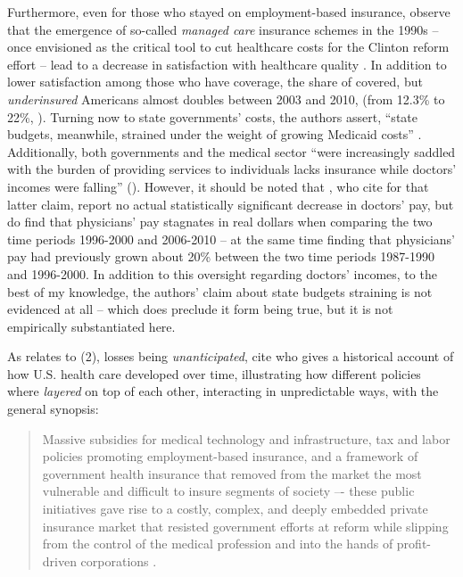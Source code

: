 \documentclass[11pt]{article}
\begin{document}
Furthermore, even for those who stayed on employment-based insurance, \textcite[][]{Jacobs2014} observe that the emergence of so-called \textit{managed care} insurance schemes in the 1990s -- once envisioned as the critical tool to cut healthcare costs for the Clinton reform effort -- lead to a decrease in satisfaction with healthcare quality \parencite[see][]{Thorpe1999}. In addition to lower satisfaction among those who have coverage, the share of covered, but \textit{underinsured} Americans almost doubles between 2003 and 2010, (from 12.3\% to 22\%, ). Turning now to state governments' costs, the authors assert, \enquote{state budgets, meanwhile, strained under the weight of growing Medicaid costs} \parencite[][p. 451]{Jacobs2014}. Additionally, both governments and the medical sector \enquote{were increasingly saddled with the burden of providing services to individuals lacks insurance while doctors' incomes were falling} (). However, it should be noted that \textcite[][]{Seabury2012}, who \textcite[][]{Jacobs2014} cite for that latter claim, report no actual statistically significant decrease in doctors' pay, but do find that physicians' pay stagnates in real dollars when comparing the two time periods 1996-2000 and 2006-2010 -- at the same time finding that physicians' pay had previously grown about 20\% between the two time periods 1987-1990 and 1996-2000. In addition to this oversight regarding doctors' incomes, to the best of my knowledge, the authors' claim about state budgets straining is not evidenced at all -- which does preclude it form being true, but it is not empirically substantiated here.

As relates to (2), losses being \textit{unanticipated}, \textcite[][]{Jacobs2014} cite \textcite[][]{Hacker1998} who gives a historical account of how U.S. health care developed over time, illustrating how different policies where \textit{layered} on top of each other, interacting in unpredictable ways, with the general synopsis:

\begin{quote}
  Massive subsidies for medical technology and infrastructure, tax and labor policies promoting employment-based insurance, and a framework of government health insurance that removed from the market the most vulnerable and difficult to insure segments of society –- these public initiatives gave rise to a costly, complex, and deeply embedded private insurance market that resisted government efforts at reform while slipping from the control of the medical profession and into the hands of profit-driven corporations \parencite[][p. 107]{Hacker1998}.
\end{quote}
\end{document}
